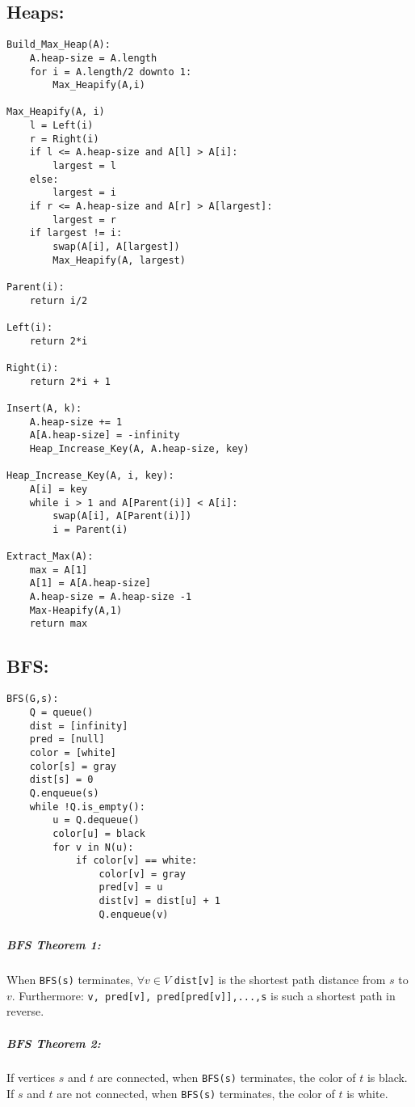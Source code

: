 \documentclass{article}
\newcommand{\code}[1]{\texttt{#1}}
\begin{document}
\subsection*{Heaps:}
\begin{lstlisting}
Build_Max_Heap(A):
    A.heap-size = A.length
    for i = A.length/2 downto 1:
        Max_Heapify(A,i)

Max_Heapify(A, i)
    l = Left(i)
    r = Right(i)
    if l <= A.heap-size and A[l] > A[i]:
        largest = l
    else:
        largest = i
    if r <= A.heap-size and A[r] > A[largest]:
        largest = r
    if largest != i:
        swap(A[i], A[largest])
        Max_Heapify(A, largest)

Parent(i):
    return i/2

Left(i):
    return 2*i

Right(i):
    return 2*i + 1

Insert(A, k):
    A.heap-size += 1
    A[A.heap-size] = -infinity
    Heap_Increase_Key(A, A.heap-size, key)

Heap_Increase_Key(A, i, key):
    A[i] = key
    while i > 1 and A[Parent(i)] < A[i]:
        swap(A[i], A[Parent(i)])
        i = Parent(i)
    
Extract_Max(A):
    max = A[1]
    A[1] = A[A.heap-size]
    A.heap-size = A.heap-size -1
    Max-Heapify(A,1)
    return max

\end{lstlisting}
\subsection*{BFS:}

\begin{lstlisting}
BFS(G,s):
    Q = queue()
    dist = [infinity]
    pred = [null]
    color = [white]
    color[s] = gray
    dist[s] = 0
    Q.enqueue(s)
    while !Q.is_empty():
        u = Q.dequeue()
        color[u] = black
        for v in N(u):
            if color[v] == white:
                color[v] = gray
                pred[v] = u
                dist[v] = dist[u] + 1
                Q.enqueue(v)
\end{lstlisting}

\subparagraph*{BFS Theorem 1:} When \code{BFS(s)} terminates, \(\forall v \in V\) \code{dist[v]} is the shortest path distance from \(s\) to \(v\). Furthermore: \code{v, pred[v], pred[pred[v]],...,s} is such a shortest path in reverse.

\subparagraph*{BFS Theorem 2:} If vertices \(s\) and \(t\) are connected, when \code{BFS(s)} terminates, the color of \(t\) is black. If \(s\) and \(t\) are not connected, when \code{BFS(s)} terminates, the color of \(t\) is white.
\end{document}
